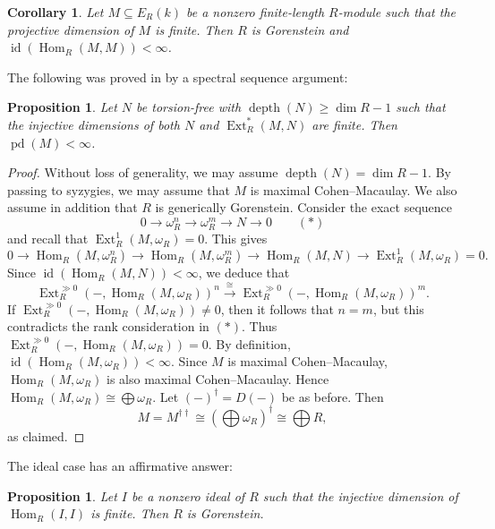\documentclass[10. pt,a4paper]{amsart}
\newtheorem{proposition}[theorem]{Proposition}
\newtheorem{corollary}[theorem]{Corollary}
\theoremstyle{definition}
\theoremstyle{remark}
\newcommand{\id}{\operatorname{id}}
\newcommand{\pd}{\operatorname{pd}}
\newcommand{\Ext}{\operatorname{Ext}}
\newcommand{\Hom}{\operatorname{Hom}}
\newcommand{\depth}{\operatorname{depth}}
\begin{document}
\begin{corollary}
	Let $M \subseteq E_R(k)$ be a nonzero finite-length $R$-module such that the projective dimension of $M$ is finite. Then $R$ is Gorenstein and $\id(\Hom_R(M, M)) < \infty$.
\end{corollary}

The following was proved in \cite{q2} by a spectral sequence argument:

\begin{proposition}
	Let $N$ be torsion-free with $\depth(N) \geq \dim R - 1$ such that the injective dimensions of both $N$ and $\Ext^\ast_R(M, N)$ are finite. Then $\pd(M) < \infty$.
\end{proposition}

\begin{proof}
	Without loss of generality, we may assume $\depth(N) = \dim R - 1$. By passing to syzygies, we may assume that $M$ is maximal Cohen--Macaulay. We also assume in addition that $R$ is generically Gorenstein. Consider the exact sequence
	\[
	0 \longrightarrow \omega_R^n \longrightarrow \omega_R^m \longrightarrow N \longrightarrow 0 \qquad (\ast)
	\]
	and recall that $\Ext^1_R(M, \omega_R) = 0$. This gives
	\[
	0 \to \Hom_R(M, \omega_R^n) \to \Hom_R(M, \omega_R^m) \to \Hom_R(M, N) \to \Ext^1_R(M, \omega_R) = 0.
	\]
	Since $\id(\Hom_R(M, N)) < \infty$, we deduce that
	\[
	\Ext^{\gg 0}_R(-, \Hom_R(M, \omega_R))^n \stackrel{\cong}{\longrightarrow} \Ext^{\gg 0}_R(-, \Hom_R(M, \omega_R))^m.
	\]
	If $\Ext^{\gg 0}_R(-, \Hom_R(M, \omega_R)) \neq 0$, then it follows that $n = m$, but this contradicts the rank consideration in $(\ast)$. Thus $\Ext^{\gg 0}_R(-, \Hom_R(M, \omega_R)) = 0$. By definition, $\id(\Hom_R(M, \omega_R)) < \infty$. Since $M$ is maximal Cohen--Macaulay, $\Hom_R(M, \omega_R)$ is also maximal Cohen--Macaulay. Hence $\Hom_R(M, \omega_R) \cong \bigoplus \omega_R$. Let $(-)^\dagger = D(-)$ be as before. Then
	\[
	M = M^{\dagger\dagger} \cong \left(\bigoplus \omega_R\right)^\dagger \cong \bigoplus R,
	\]
	as claimed.
\end{proof}

The ideal case has an affirmative answer:

\begin{proposition}\label{88}
	Let $I$ be a nonzero ideal of $R$ such that the injective dimension of $\Hom_R(I, I)$ is finite. Then $R$ is Gorenstein.
\end{proposition}
\end{document}
